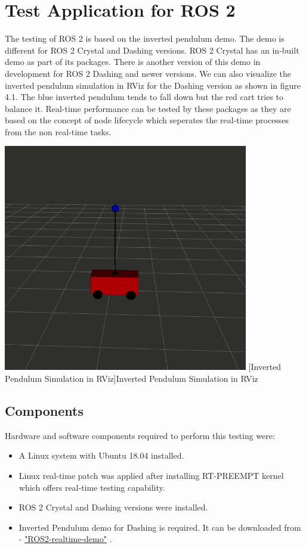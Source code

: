 \documentclass[%
xelatex,
	oneside,		%
	12pt,			%
	parskip=half,	%
	abstracton,
	chapterprefix=true%
    appendixprefix=true]
{scrbook}
\begin{document}
\section{Test Application for ROS 2}
\vspace*{0.5cm}
The testing of ROS 2 is based on the inverted pendulum demo. The demo is different for ROS 2 Crystal and Dashing versions. ROS 2 Crystal has an in-built demo as part of its packages. There is another version of this demo in development for ROS 2 Dashing and newer versions. We can also visualize the inverted pendulum simulation in RViz for the Dashing version as shown in figure 4.1. The blue inverted pendulum tends to fall down but the red cart tries to balance it. Real-time performance can be tested by these packages as they are based on the concept of node lifecycle which seperates the real-time processes from the non real-time tasks.
			\begin{center}
\includegraphics[scale=0.51]{fig/invertedpendulum.png}
[Inverted Pendulum Simulation in RViz]{Inverted Pendulum Simulation in RViz}
\label{fig:invertedpendulum}
\end{center}

	\subsection{Components}
	\vspace*{0.5cm}
Hardware and software components required to perform this testing were:
	\begin{itemize}
	\item A Linux system with Ubuntu 18.04 installed.
	\item Linux real-time patch was applied after installing RT-PREEMPT kernel which offers real-time testing capability.
	\item ROS 2 Crystal and Dashing versions were installed.
	\item Inverted Pendulum demo for Dashing is required. It can be downloaded from - \href{https://github.com/ros2-realtime-demo/pendulum}{"ROS2-realtime-demo"} \cite{rtpendulum}.
	\end{itemize}
\end{document}
